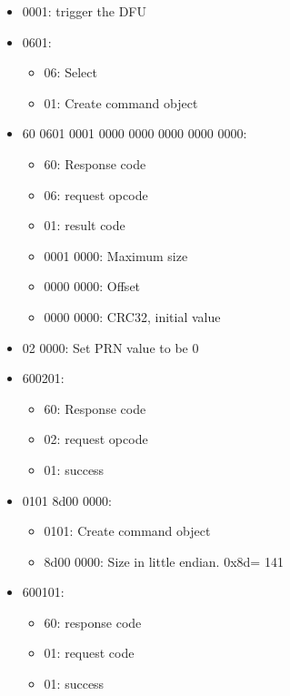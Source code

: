 \begin{itemize}
\tightlist
\item
  0001: trigger the DFU
\item
  0601:

  \begin{itemize}
  \tightlist
  \item
    06: Select
  \item
    01: Create command object
  \end{itemize}
\item
  60 0601 0001 0000 0000 0000 0000 0000:

  \begin{itemize}
  \tightlist
  \item
    60: Response code
  \item
    06: request opcode
  \item
    01: result code
  \item
    0001 0000: Maximum size
  \item
    0000 0000: Offset
  \item
    0000 0000: CRC32, initial value
  \end{itemize}
\item
  02 0000: Set PRN value to be 0
\item
  600201:

  \begin{itemize}
  \tightlist
  \item
    60: Response code
  \item
    02: request opcode
  \item
    01: success
  \end{itemize}
\item
  0101 8d00 0000:

  \begin{itemize}
  \tightlist
  \item
    0101: Create command object
  \item
    8d00 0000: Size in little endian. 0x8d= 141
  \end{itemize}
\item
  600101:

  \begin{itemize}
  \tightlist
  \item
    60: response code
  \item
    01: request code
  \item
    01: success
  \end{itemize}
\end{itemize}

